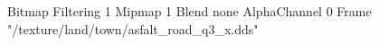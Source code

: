 {Bitmap
	{Filtering 1}
	{Mipmap 1}
	{Blend none}
	{AlphaChannel 0}
	{Frame "/texture/land/town/asfalt_road_q3_x.dds"}
}
